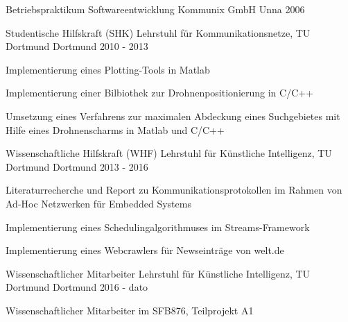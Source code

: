 

\begin{cventries}

  \cventry
    {Betriebspraktikum Softwareentwicklung} %
    {Kommunix GmbH} %
    {Unna} %
    {2006} %
    {
    }

  \cventry
    {Studentische Hilfskraft (SHK)} %
    {Lehrstuhl für Kommunikationsnetze, TU Dortmund} %
    {Dortmund} %
    {2010 - 2013} %
    {
      \begin{cvitems} %
        \item {Implementierung eines Plotting-Tools in Matlab}
        \item {Implementierung einer Bilbiothek zur Drohnenpositionierung in C/C++}
        \item {Umsetzung eines Verfahrens zur maximalen Abdeckung eines Suchgebietes mit Hilfe eines Drohnenscharms in Matlab und C/C++}
      \end{cvitems}
    }

    \cventry
    {Wissenschaftliche Hilfskraft (WHF)} %
    {Lehrstuhl für Künstliche Intelligenz, TU Dortmund} %
    {Dortmund} %
    {2013 - 2016} %
    {
      \begin{cvitems} %
        \item {Literaturrecherche und Report zu Kommunikationsprotokollen im Rahmen von Ad-Hoc Netzwerken für Embedded Systems}
        \item {Implementierung eines Schedulingalgorithmuses im Streams-Framework}
        \item {Implementierung eines Webcrawlers für Newseinträge von welt.de}
      \end{cvitems}
    }

  \cventry
    {Wissenschaftlicher Mitarbeiter} %
    {Lehrstuhl für Künstliche Intelligenz, TU Dortmund} %
    {Dortmund} %
    {2016 - dato} %
    {
      \begin{cvitems} %
        \item {Wissenschaftlicher Mitarbeiter im SFB876, Teilprojekt A1}
      \end{cvitems}
    }

\end{cventries}
